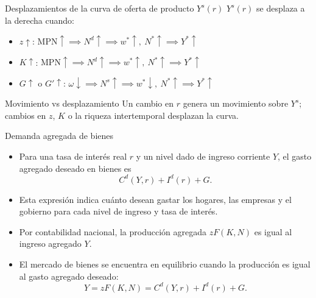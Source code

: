 \documentclass[aspectratio=169,11pt]{beamer}
\begin{document}
\begin{frame}{Desplazamientos de la curva de oferta de producto \(Y^s(r)\)}
  \(Y^s(r)\) se desplaza a la derecha cuando:
  \begin{itemize}
    \setlength{\itemsep}{0.58em}
    \item \(z\uparrow\): $\mathrm{MPN} \uparrow \implies N^d \uparrow \implies w^* \uparrow, \ N^* \uparrow \implies  Y^* \uparrow$
    \item \(K\uparrow\): $\mathrm{MPN} \uparrow \implies N^d \uparrow \implies w^* \uparrow, \ N^* \uparrow \implies  Y^* \uparrow$
    \item \(G\uparrow\) o \(G'\uparrow\): $\omega \downarrow \implies N^s \uparrow \implies w^* \downarrow, \ N^* \uparrow \implies Y^* \uparrow$
  \end{itemize}
  \begin{alertblock}{Movimiento vs desplazamiento}
    Un cambio en \(r\) genera un movimiento sobre \(Y^s\); cambios en \(z\), \(K\) o la riqueza intertemporal desplazan la curva.
  \end{alertblock}
\end{frame}


\begin{frame}{Demanda agregada de bienes}
  \small
  \begin{itemize}
    \setlength{\itemsep}{0.55em}

    \item Para una tasa de interés real \(r\) y un nivel dado de ingreso corriente \(Y\), el gasto agregado deseado en bienes es
    \[
      C^d(Y,r)+I^d(r)+G.
    \]
    
    \item Esta expresión indica cuánto desean gastar los hogares, las empresas y el gobierno para cada nivel de ingreso y tasa de interés.

    \item Por contabilidad nacional, la producción agregada $zF(K,N)$ es igual al ingreso agregado $Y$. 

    \item El mercado de bienes se encuentra en equilibrio cuando la producción es igual al gasto agregado deseado:
    \[
      \boxed{Y = zF(K,N) = C^d(Y,r)+I^d(r)+G}.
    \]
  \end{itemize}
\end{frame}
\end{document}
